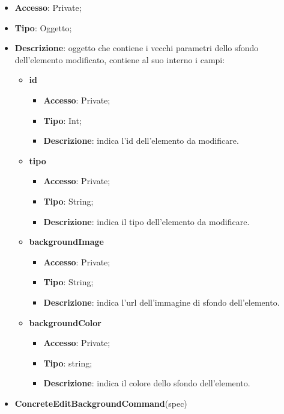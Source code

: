 {{{\begin{itemize}
				\begin{itemize}
				\item \textbf{Accesso}: Private;
				\item \textbf{Tipo}: Oggetto;
				\item \textbf{Descrizione}: oggetto che contiene i vecchi parametri dello sfondo dell'elemento modificato, contiene al suo interno i campi:
				\begin{itemize}
				\item \textbf{id}
				\begin{itemize}
					\item \textbf{Accesso}: Private;
					\item \textbf{Tipo}: Int;
					\item \textbf{Descrizione}: indica l'id dell’elemento da modificare.
				\end{itemize}
				\item \textbf{tipo}
				\begin{itemize}
					\item \textbf{Accesso}: Private;
					\item \textbf{Tipo}: String;
					\item \textbf{Descrizione}: indica il tipo dell’elemento da modificare.
				\end{itemize}
				\item \textbf{backgroundImage}
				\begin{itemize}
					\item \textbf{Accesso}: Private;
					\item \textbf{Tipo}: String;
					\item \textbf{Descrizione}: indica l'url dell'immagine di sfondo dell’elemento.
				\end{itemize}
				\item \textbf{backgroundColor}
				\begin{itemize}
					\item \textbf{Accesso}: Private;
					\item \textbf{Tipo}: string;
					\item \textbf{Descrizione}: indica il colore dello sfondo dell’elemento.
				\end{itemize}
			\end{itemize}
				\end{itemize}
				\end{itemize}
			\begin{itemize}
				\item \textbf{ConcreteEditBackgroundCommand}(spec)

\end{itemize}}}}
